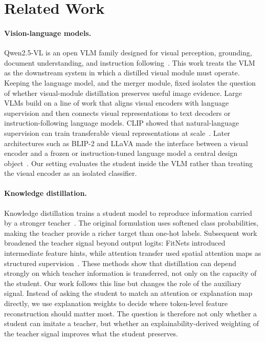 \documentclass{article}
\begin{document}
\section{Related Work}
\label{sec:related}

\paragraph{Vision-language models.}
Qwen2.5-VL is an open VLM family designed for visual perception, grounding, document understanding, and instruction following~\citep{qwen2025vl}.
This work treats the VLM as the downstream system in which a distilled visual module must operate. Keeping the language model, and the merger module, fixed isolates the question of whether visual-module distillation preserves useful image evidence.
Large VLMs build on a line of work that aligns visual encoders with language supervision and then connects visual representations to text decoders or instruction-following language models.
CLIP showed that natural-language supervision can train transferable visual representations at scale~\citep{radford2021clip}.
Later architectures such as BLIP-2 and LLaVA made the interface between a visual encoder and a frozen or instruction-tuned language model a central design object~\citep{li2023blip2,liu2023llava}.
Our setting evaluates the student inside the VLM rather than treating the visual encoder as an isolated classifier.

\paragraph{Knowledge distillation.}
Knowledge distillation trains a student model to reproduce information carried by a stronger teacher~\citep{hinton2015distilling}.
The original formulation uses softened class probabilities, making the teacher provide a richer target than one-hot labels.
Subsequent work broadened the teacher signal beyond output logits: FitNets introduced intermediate feature hints, while attention transfer used spatial attention maps as structured supervision~\citep{romero2015fitnets,zagoruyko2017attention}.
These methods show that distillation can depend strongly on which teacher information is transferred, not only on the capacity of the student.
Our work follows this line but changes the role of the auxiliary signal.
Instead of asking the student to match an attention or explanation map directly, we use explanation weights to decide where token-level feature reconstruction should matter most.
The question is therefore not only whether a student can imitate a teacher, but whether an explainability-derived weighting of the teacher signal improves what the student preserves.
\end{document}

